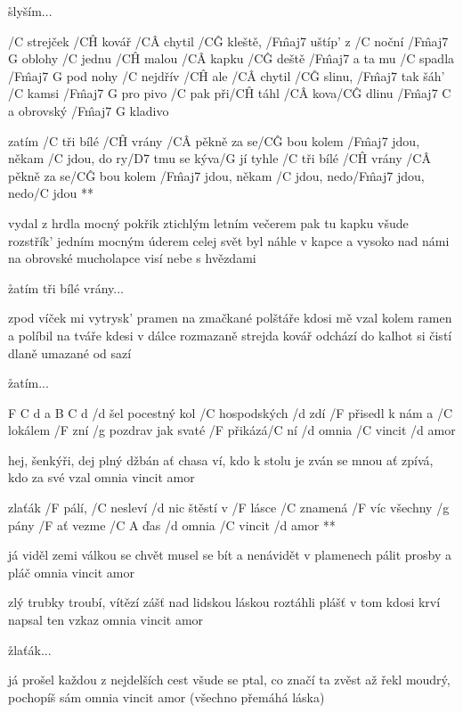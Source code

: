 \r slyším...




/C strejček /C\^H kovář /C\^A chytil /C\^G kleště, /F\^{maj7} uštíp' z /C noční /{F\^{maj7} G} oblohy
/C jednu /C\^H malou /C\^A kapku /C\^G deště /F\^{maj7} a ta mu /C spadla /{F\^{maj7} G} pod nohy
/C nejdřív /C\^H ale /C\^A chytil /C\^G slinu, /F\^{maj7} tak šáh' /C kamsi /{F\^{maj7} G} pro pivo
/C pak při/C\^H táhl /C\^A kova/C\^G dlinu /{F\^{maj7} C} a obrovský /{F\^{maj7} G} kladivo

\R  zatím /C tři bílé /C\^H vrány /C\^A pěkně za se/C\^G bou
    kolem /F\^{maj7} jdou, někam /C jdou, do ry/D7 tmu se kýva/G jí
    tyhle /C tři bílé /C\^H vrány /C\^A pěkně za se/C\^G bou
    kolem /F\^{maj7} jdou, někam /C jdou, nedo/F\^{maj7} jdou, nedo/C jdou **

vydal z hrdla mocný pokřik ztichlým letním večerem
pak tu kapku všude rozstřík' jedním mocným úderem
celej svět byl náhle v kapce a vysoko nad námi
na obrovské mucholapce visí nebe s hvězdami

\r zatím tři bílé vrány...

zpod víček mi vytrysk' pramen na zmačkané polštáře
kdosi mě vzal kolem ramen a políbil na tváře
kdesi v dálce rozmazaně strejda kovář odchází
do kalhot si čistí dlaně umazané od sazí

\r zatím...




F C d a B C d
/d šel pocestný kol /C hospodských /d zdí
/F přisedl k nám a /C lokálem /F zní
/g pozdrav jak svaté /F přikázá/C ní
/d omnia /C vincit /d amor \s

hej, šenkýři, dej plný džbán
ať chasa ví, kdo k stolu je zván
se mnou ať zpívá, kdo za své vzal
omnia vincit amor \s

\R zlaťák /F pálí, /C nesleví /d nic
   štěstí v /F lásce /C znamená /F víc
   všechny /g pány /F ať vezme /{C A} ďas
   /d omnia /C vincit /d amor **

já viděl zemi válkou se chvět
musel se bít a nenávidět
v plamenech pálit prosby a pláč
omnia vincit amor \s

zlý trubky troubí, vítězí zášť
nad lidskou láskou roztáhli plášť
v tom kdosi krví napsal ten vzkaz
omnia vincit amor \s

\r zlaťák...

já prošel každou z nejdelších cest
všude se ptal, co značí ta zvěst
až řekl moudrý, pochopíš sám
omnia vincit amor (všechno přemáhá láska) \s

